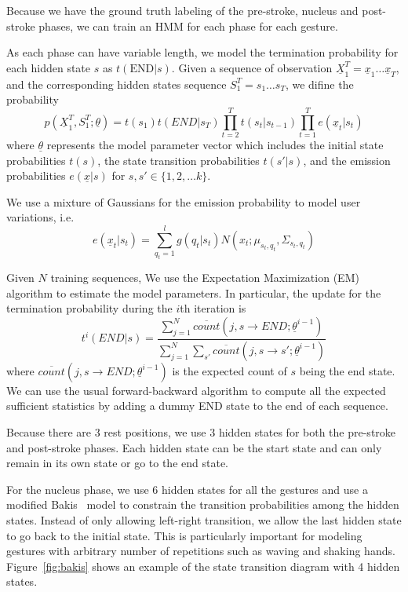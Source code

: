 \documentclass{acm_proc_article-sp}
\begin{document}
Because we have the ground truth labeling of the pre-stroke, nucleus and post-stroke phases, 
we can train an HMM for each phase for each gesture. 

As each phase can have variable length, we model the termination probability for each
hidden state $s$ as $t(\text{END}|s)$. Given a sequence of observation $\underline{X}_1^T = \underline{x}_1\ldots\underline{x}_T$, and 
the corresponding hidden states sequence $S_1^T = s_1\ldots s_T$, we difine the probability
\begin{displaymath}
p(\underline{X}_1^T, S_1^T;\underline{\theta}) = 
    t(s_1)t(END|s_T)\prod_{t = 2}^T t(s_t | s_{t-1})\prod_{t = 1}^T e(\underline{x}_t|s_t)
\end{displaymath}
where $\underline{\theta}$ represents the model parameter vector which includes
the initial state probabilities $t(s)$, the state transition probabilities $t(s'|s)$, and the 
emission probabilities $e(\underline{x}|s)$ for $s, s'\in \{1, 2,\ldots k\}$. 

We use a mixture of Gaussians for the emission probability to model user variations, i.e.
\begin{displaymath}
e(\underline{x}_t|s_t) = \sum_{q_t = 1}^l g(q_t | s_t)N(x_t; \mu_{s_t,q_t}, \Sigma_{s_t,q_t})
\end{displaymath} 

Given $N$ training sequences, We use the Expectation Maximization (EM) algorithm to estimate the model parameters. In
particular, the update for the termination probability during the $i$th iteration is 
\begin{displaymath}
t^i(END|s) = \frac{\sum_{j = 1}^N \overline{count}(j, s\rightarrow END;\underline{\theta}^{i-1})}
    {\sum_{j = 1}^N\sum_{s'} \overline{count}(j, s\rightarrow s';\underline{\theta}^{i-1})}
\end{displaymath}
where $\overline{count}(j, s\rightarrow END;\underline{\theta}^{i-1})$ is the expected count of 
$s$ being the end state. We can use the usual forward-backward algorithm to compute all the 
expected sufficient statistics by adding a dummy END state to the end of each sequence.

Because there are 3 rest positions, we use 3 hidden states for both the pre-stroke and post-stroke phases.
Each hidden state can be the start state and can only remain in its own state or go to the end state.
 
For the nucleus phase, we use 6 hidden states for all the gestures and use a modified Bakis~\cite{} model to constrain the transition probabilities
among the hidden states. Instead of only allowing left-right transition, we allow the last hidden state
to go back to the initial state. This is particularly important for modeling gestures with arbitrary number of
repetitions such as waving and shaking hands. Figure~\ref{fig:bakis} shows an example of the state transition diagram with 4 hidden states.
\end{document}
